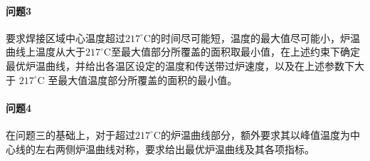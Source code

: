 \documentclass[../main.tex]{subfiles}
\begin{document}
\paragraph{问题3}
要求焊接区域中心温度超过\(217^{\circ}\mathrm{C}\)的时间尽可能短，温度的最大值尽可能小，炉温曲线上温度从大于\(217^{\circ}\mathrm{C}\)至最大值部分所覆盖的面积取最小值，在上述约束下确定最优炉温曲线，并给出各温区设定的温度和传送带过炉速度，以及在上述参数下大于 \(217 ^{\circ}\mathrm{C}\) 至最大值温度部分所覆盖的面积的最小值。

\paragraph{问题4}
在问题三的基础上，对于超过\(217 ^{\circ}\mathrm{C}\)的炉温曲线部分，额外要求其以峰值温度为中心线的左右两侧炉温曲线对称，要求给出最优炉温曲线及其各项指标。
\end{document}
